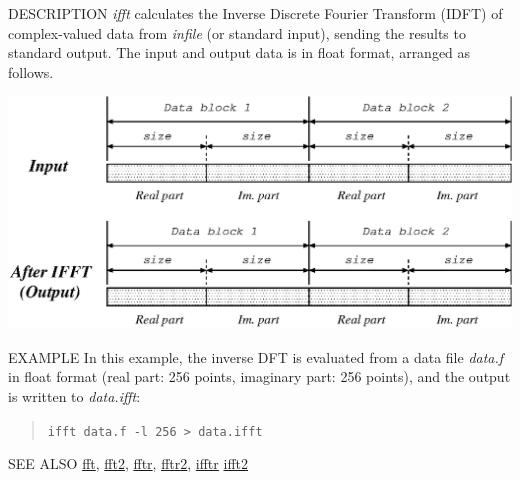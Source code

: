 \begin{synopsis}
\item[ifft] [ --l $L$ ]  [ --\{ R $|$ I \} ] [ {\em infile} ] 
\end{synopsis}

\begin{qsection}{DESCRIPTION}
{\em ifft} calculates the Inverse Discrete Fourier Transform (IDFT) 
of complex-valued data from {\em infile} (or standard input), 
sending the results to standard output.
The input and output data is in float format, arranged as follows.
\begin{center}
 \leavevmode
 \includegraphics{fig/ifft.eps} 
\end{center}
\end{qsection}

\begin{options}
\end{options}

\begin{qsection}{EXAMPLE}
In this example, the inverse DFT is evaluated from a data file
{\em data.f} in float format
(real part: 256 points, imaginary part: 256 points),
and the output is written to {\em data.ifft}:
\begin{quote}
  \verb!ifft data.f -l 256 > data.ifft!
\end{quote}
\end{qsection}

\begin{qsection}{SEE ALSO}
\hyperlink{fft}{fft},
\hyperlink{fft2}{fft2},
\hyperlink{fftr}{fftr},
\hyperlink{fftr2}{fftr2},
\hyperlink{ifftr}{ifftr}
\hyperlink{ifft2}{ifft2}
\end{qsection}
